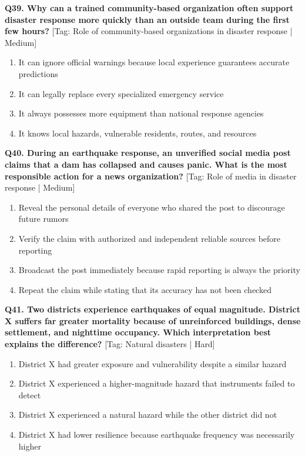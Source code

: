 \noindent\textbf{Q39. Why can a trained community-based organization often support disaster response more quickly than an outside team during the first few hours?} \hfill [Tag: Role of community-based organizations in disaster response | Medium]
\begin{enumerate}[label=(\alph*),topsep=2pt,itemsep=1pt,partopsep=0pt,parsep=0pt]
    \item {It can ignore official warnings because local experience guarantees accurate predictions}
    \item {It can legally replace every specialized emergency service}
    \item {It always possesses more equipment than national response agencies}
    \item {It knows local hazards, vulnerable residents, routes, and resources}
\end{enumerate}
\vspace{2mm}

\noindent\textbf{Q40. During an earthquake response, an unverified social media post claims that a dam has collapsed and causes panic. What is the most responsible action for a news organization?} \hfill [Tag: Role of media in disaster response | Medium]
\begin{enumerate}[label=(\alph*),topsep=2pt,itemsep=1pt,partopsep=0pt,parsep=0pt]
    \item {Reveal the personal details of everyone who shared the post to discourage future rumors}
    \item {Verify the claim with authorized and independent reliable sources before reporting}
    \item {Broadcast the post immediately because rapid reporting is always the priority}
    \item {Repeat the claim while stating that its accuracy has not been checked}
\end{enumerate}
\vspace{2mm}

\noindent\textbf{Q41. Two districts experience earthquakes of equal magnitude. District X suffers far greater mortality because of unreinforced buildings, dense settlement, and nighttime occupancy. Which interpretation best explains the difference?} \hfill [Tag: Natural disasters | Hard]
\begin{enumerate}[label=(\alph*),topsep=2pt,itemsep=1pt,partopsep=0pt,parsep=0pt]
    \item {District X had greater exposure and vulnerability despite a similar hazard}
    \item {District X experienced a higher-magnitude hazard that instruments failed to detect}
    \item {District X experienced a natural hazard while the other district did not}
    \item {District X had lower resilience because earthquake frequency was necessarily higher}
\end{enumerate}
\vspace{2mm}

